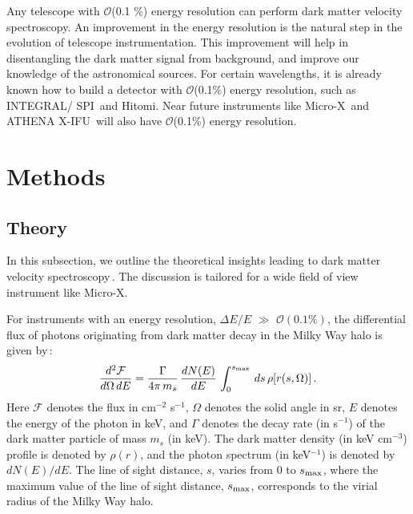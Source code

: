 \documentclass[aps,prd,10pt,twocolumn,superscriptaddress,showpacs]{revtex4-1}
\begin{document}
Any telescope with $\mathcal{O}$(0.1 \%) energy resolution can perform dark matter velocity spectroscopy.  An improvement in the energy resolution is the natural step in the evolution of telescope instrumentation.  This improvement will help in disentangling the dark matter signal from background, and improve our knowledge of the astronomical sources.  For certain wavelengths, it is already known how to build a detector with $\mathcal{O}$(0.1\%) energy resolution, such as INTEGRAL/ SPI\,\cite{2003AA} and Hitomi.  Near future instruments like Micro-X\,\cite{Figueroa-Feliciano:2015gwa} and ATHENA X-IFU\,\cite{Barret:2016ett} will also have $\mathcal{O}$(0.1\%) energy resolution.

\section{Methods}
\subsection{Theory}
\label{sec:theory}

In this subsection, we outline the theoretical insights leading to dark matter velocity spectroscopy\,\cite{speckhard2016}.  The discussion is tailored for a wide field of view instrument like Micro-X.

For instruments with an energy resolution, $\Delta E/E$ $\gg$ $\mathcal{O} (0.1\%)$, the differential flux of photons originating from dark matter decay in the Milky Way halo is given by\,\cite{Figueroa-Feliciano:2015gwa}:
\begin{eqnarray}
\dfrac{d^2 \mathcal{F}}{d\Omega \, dE} =  \dfrac{\Gamma}{4\pi \, m_s} \, \dfrac{dN(E)}{dE} \, \int _0 ^{s_{\rm max}}  \, ds \, \rho[r(s, \Omega)]  \,.
\label{eq:double differential for the flux}
\end{eqnarray}
Here $\mathcal{F}$ denotes the flux in cm$^{-2}$ s$^{-1}$, $\Omega$ denotes the solid angle in sr, $E$ denotes the energy of the photon in keV, and $\Gamma$ denotes the decay rate (in s$^{-1}$) of the dark matter particle of mass $m_s$ (in keV).  The dark matter density (in keV cm$^{-3}$) profile is denoted by $\rho(r)$, and the photon spectrum (in keV$^{-1}$) is denoted by $dN(E)/dE$.  The line of sight distance, $s$, varies from 0 to $s_{\rm max}$, where the maximum value of the line of sight distance, $s_{\rm max}$, corresponds to the virial radius of the Milky Way halo.
\end{document}
